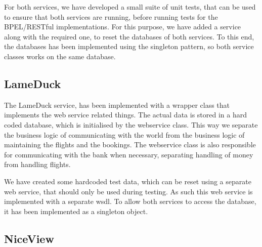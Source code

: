 For both services, we have developed a small suite of unit tests, that can be used to ensure that both services are running, before running tests for the BPEL/RESTful implementations. For this purpose, we have added a service along with the required one, to reset the databases of both services. To this end, the databases has been implemented using the singleton pattern, so both service classes works on the same database.


\subsection{LameDuck}
The LameDuck service, has been implemented with a wrapper class that implements the web service related things. The actual data is stored in a hard coded database, which is initialised by the webservice class. This way we separate the business logic of communicating with the world from the business logic of maintaining the flights and the bookings. The webservice class is also responsible for communicating with the bank when necessary, separating handling of money from handling flights.

We have created some hardcoded test data, which can be reset using a separate web service, that should only be used during testing. As such this web service is implemented with a separate wsdl. To allow both services to access the database, it has been implemented as a singleton object.


\subsection{NiceView}


